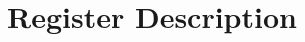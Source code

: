 \documentclass[11pt, oneside]{book}
\makeatletter
\newcommand{\DocTitle}{xregister datasheet}
\newcommand{\DocType}{Generated by xregister}
\newcommand{\DocAuthor}{xin\_meng@vlsi.zju.edu.cn}
\makeatother
\begin{document}











\frontmatter
\mainmatter
\chapter{Register Description}

\appendix
{}
\printindex
{} 
\end{document}
